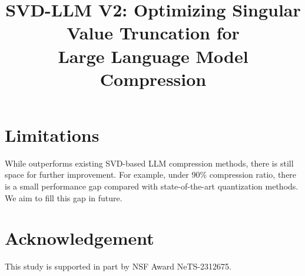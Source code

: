 \documentclass[11pt]{article}
\title{SVD-LLM V2: Optimizing Singular Value Truncation for \\ Large Language Model Compression}
\begin{document}
\maketitle







%
\vspace{-1mm}
\section{Limitations}
\vspace{-1mm}

While \sysname outperforms existing SVD-based LLM compression methods, there is still space for further improvement. For example, under 90\% compression ratio, there is a small performance gap compared with state-of-the-art quantization methods.
%
We aim to fill this gap in future.

\vspace{-1mm}
\section{Acknowledgement}
\vspace{-1mm}

This study is supported in part by NSF Award NeTS-2312675.

\newpage

% 
\end{document}
